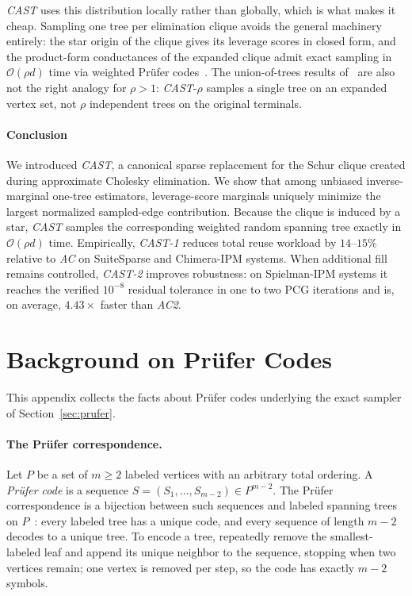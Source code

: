 \documentclass{article}
\newcommand{\CAST}{\textit{CAST}\xspace}
\newcommand{\CASTone}{\textit{CAST-1}\xspace}
\newcommand{\CASTtwo}{\textit{CAST-2}\xspace}
\newcommand{\AC}{\textit{AC}\xspace}
\newcommand{\ACtwo}{\textit{AC2}\xspace}
\newcommand{\calO}{\mathcal{O}}
\newcommand{\bigO}{\calO}
\newcommand{\1}{\mathbbm{1}}
\theoremstyle{plain}
\begin{document}
\CAST{} uses this distribution locally rather than globally, which is
what makes it cheap. Sampling one tree per elimination clique avoids
the general machinery entirely: the star origin of the clique gives
its leverage scores in closed form, and the product-form conductances
of the expanded clique admit exact sampling in $\bigO(\rho d)$ time
via weighted Pr\"ufer codes~\cite{aigner1999proofs,west2001introduction}.
The union-of-trees results of~\cite{kyng2018matrix} are also not the
right analogy for $\rho>1$: \CAST-$\rho$ samples a single tree on an
expanded vertex set, not $\rho$ independent trees on the original terminals.

\paragraph{\textbf{Conclusion}}
\label{sec:conclusion}
We introduced \CAST{}, a canonical sparse replacement for the Schur
clique created during approximate Cholesky elimination. We show that among unbiased
inverse-marginal one-tree estimators, leverage-score marginals
uniquely minimize the largest normalized sampled-edge contribution.
Because the clique is induced by a star, \CAST{} samples the
corresponding weighted random spanning tree exactly in
$\bigO(\rho d)$ time. Empirically, \CASTone{} reduces total reuse
workload by $14$--$15\%$ relative to \AC{} on SuiteSparse and
Chimera-IPM systems. When additional fill remains controlled, \CASTtwo{} improves
robustness: on Spielman-IPM systems it reaches the verified $10^{-8}$
residual tolerance in one to two PCG iterations and is, on average,
$4.43\times$ faster than \ACtwo{}. %

    


\appendix

\section{Background on Pr\"ufer Codes}
\label{app:prufer-background}

This appendix collects the facts about Pr\"ufer codes underlying the
exact sampler of Section~\ref{sec:prufer}.

\paragraph{The Pr\"ufer correspondence.}
Let $P$ be a set of $m\geq 2$ labeled vertices with an arbitrary total
ordering. A \emph{Pr\"ufer code} is a sequence
$S=(S_1,\ldots,S_{m-2})\in P^{m-2}$. The Pr\"ufer correspondence is a
bijection between such sequences and labeled spanning trees on
$P$~\cite{aigner1999proofs,west2001introduction}: every labeled tree
has a unique code, and every sequence of length $m-2$ decodes to a
unique tree. To encode a tree, repeatedly remove the smallest-labeled
leaf and append its unique neighbor to the sequence, stopping when two
vertices remain; one vertex is removed per step, so the code has
exactly $m-2$ symbols.
\end{document}
